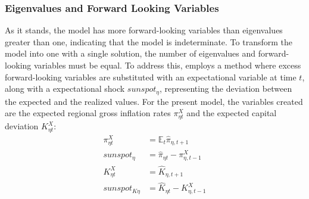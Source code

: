 \documentclass[../thesis.tex]{subfiles}
\begin{document}
\subsubsection{Eigenvalues and Forward Looking Variables}

As it stands, the model has more forward-looking variables than eigenvalues greater than one, indicating that the model is indeterminate. To transform the model into one with a single solution, the number of eigenvalues and forward-looking variables must be equal. To address this, \textcite{farmer_solving_2015} employs a method where excess forward-looking variables are substituted with an expectational variable at time $t$, along with a expectational shock $sunspot_{\eta}$, representing the deviation between the expected and the realized values. For the present model, the variables created are the expected regional gross inflation rates $\pi_{\eta t}^{X}$ and the expected capital deviation $K_{\eta t}^{X}$:
\begin{align}
	\pi_{\eta t}^{X} &= \mathbb{E}_t \hat{\pi}_{\eta, t+1} \label{ext-mod:reg-pix} \\
	sunspot_{\eta} &= \hat{\pi}_{\eta t} - \pi_{\eta, t-1}^{X} \label{ext-mod:sunspot} \\
	K_{\eta t}^{X} &= \hat{K}_{\eta, t+1} \label{ext-mod:reg-capital-x} \\
	sunspot_{K\eta} &= \hat{K}_{\eta t} - K_{\eta, t-1}^{X} \label{ext-mod:sunspot-k}
\end{align}
\end{document}
